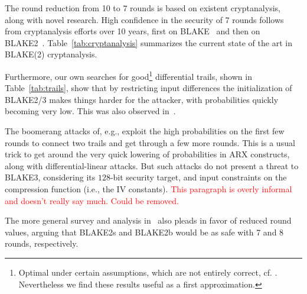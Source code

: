 \documentclass[11pt,notitlepage,a4paper]{article}
\newcommand{\alert}[1]{\textcolor{red}{#1}}
\begin{document}
The round reduction from 10 to 7 rounds is based on existent cryptanalysis, along with novel research.
High confidence in the security of 7 rounds follows from cryptanalysis
efforts over 10 years, first on
BLAKE~\cite{DBLP:conf/cans/SuWWD10,DBLP:journals/ipl/VidaliNP10,DBLP:journals/iet-ifs/BaiYWW15,DBLP:conf/fse/AumassonGKMM10,DBLP:journals/iacr/JiL09,DK11,DBLP:conf/fse/BiryukovNR11}
and then on BLAKE2~\cite{DBLP:conf/ctrsa/0001KNWW14,DBLP:conf/cisc/Hao14,DBLP:conf/crypto/EspitauFK15}. Table~\ref{tab:cryptanalysis} summarizes the current state of the art in BLAKE(2) cryptanalysis.

Furthermore, our own searches for good\footnote{Optimal under certain assumptions, which are not entirely correct, cf. \cite{cryptoeprint:2013:328}. Nevertheless we find these results useful as a first approximation.} differential trails, shown in Table~\ref{tab:trails}, show that by restricting input differences the initialization of BLAKE2/3 makes things harder for the attacker, with probabilities quickly becoming very low. This was also observed in~\cite[\S7]{DBLP:conf/ctrsa/0001KNWW14}. 

The boomerang attacks of, e.g., \cite{DBLP:conf/cisc/Hao14,DBLP:conf/fse/BiryukovNR11,DBLP:journals/iet-ifs/BaiYWW15} exploit the high probabilities on the first few rounds to connect two trails and get through a few more rounds. This is a usual trick to get around the very quick lowering of probabilities in ARX constructs, along with differential-linear attacks. But such attacks do not present a threat to BLAKE3, considering its $128$-bit security target, and input constraints on the compression function (i.e., the IV constants). \alert{This paragraph is overly informal and doesn't really say much. Could be removed.}

The more general survey and analysis in~\cite{TMC} also pleads in favor
of reduced round values, arguing that BLAKE2s and BLAKE2b would be as
safe with 7 and 8 rounds, respectively.
\end{document}

